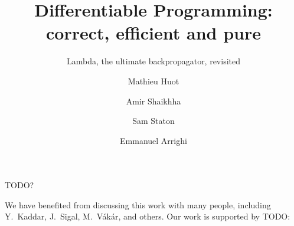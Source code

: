 \documentclass[acmsmall,review,anonymous]{acmart}\settopmatter{printfolios=true,printccs=false,printacmref=false}
\begin{document}
\title{Differentiable Programming: correct, efficient and pure}
\subtitle{Lambda, the ultimate backpropagator, revisited}

\author{Mathieu Huot}

\author{Amir Shaikhha}

\author{Sam Staton}

\author{Emmanuel Arrighi}

\renewcommand{\shortauthors}{Huot, et al.}



\begin{CCSXML}
TODO?
\end{CCSXML}


\maketitle


\begin{acks}
We have benefited from discussing this work with many people, including Y.~Kaddar, J.~Sigal, M.~V\'ak\'ar, and others. 
Our work is supported by TODO:
\end{acks}


\end{document}
